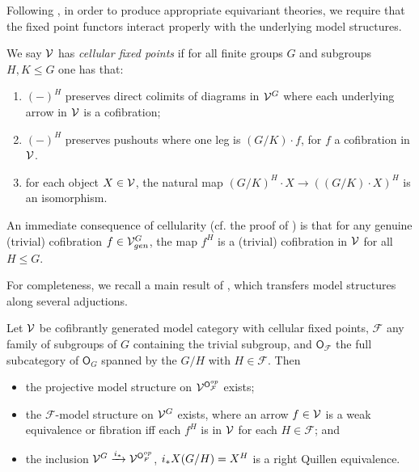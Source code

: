 \documentclass[a4paper,10pt
,draft
]{article}%
\renewcommand{\F}{\mathcal F}
\renewcommand{\1}{\eta}%
\begin{document}
Following \cite{Ste16, BP_geo}, in order to produce appropriate equivariant theories,
we require that the fixed point functors interact properly with the underlying model structures.
\begin{definition}
      \label{CELLFP_DEF}
      We say $\mathcal V$ has \textit{cellular fixed points} if
      for all finite groups $G$ and subgroups $H, K \leq G$ one has that:
      \begin{enumerate}[label = (\roman*)]
      \item $(-)^H$ preserves direct colimits of diagrams in $\mathcal V^G$ where each underlying arrow in $\mathcal V$ is a cofibration;
      \item $(-)^H$ preserves pushouts where one leg is $(G/K) \cdot f$, for $f$ a cofibration in $\mathcal V$.
      \item for each object $X \in \mathcal V$, the natural map $(G/K)^H \cdot X \to ((G/K) \cdot X)^H$ is an isomorphism.
      \end{enumerate}
\end{definition}

\begin{remark}
      \label{LEVEL_COF_REM}
      An immediate consequence of cellularity (cf. the proof of \cite[Prop. 6.3(i)]{BP_geo})
      is that for any genuine (trivial) cofibration $f \in \mathcal V^G_{gen}$,
      the map $f^H$ is a (trivial) cofibration in $\mathcal V$ for all $H \leq G$.
\end{remark}


For completeness, we recall a main result of \cite{Ste16}, which transfers model structures along several adjuctions.
\begin{theorem}
      Let $\mathcal V$ be cofibrantly generated model category with cellular fixed points, $\F$ any family of subgroups of $G$ containing the trivial subgroup, and $\mathsf O_\F$ the full subcategory of $\mathsf O_G$ spanned by the $G/H$ with $H \in \F$.
      Then
      \begin{itemize}
      \item the projective model structure on $\V^{\mathsf O_\F^{op}}$ exists;
      \item the $\F$-model structure on $\mathcal V^G$ exists, where an arrow $f \in \mathcal V$ is a weak equivalence or fibration iff each $f^H$ is in $\mathcal V$ for each $H \in \F$; and
      \item the inclusion $\V^G \xrightarrow{i_{\**}} \V^{\mathsf O_F^{op}}$, $i_{\**}X(G/H) = X^H$ is a right Quillen equivalence.
      \end{itemize}
\end{theorem}      
\end{document}
